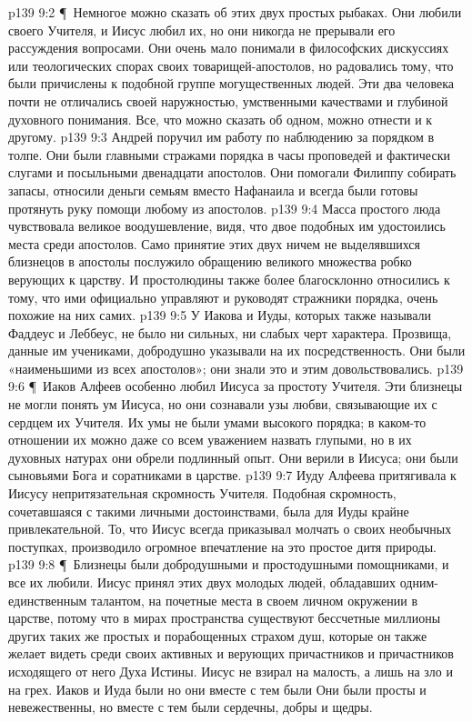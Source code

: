 \vs p139 9:2 \P\ Немногое можно сказать об этих двух простых рыбаках. Они любили своего Учителя, и Иисус любил их, но они никогда не прерывали его рассуждения вопросами. Они очень мало понимали в философских дискуссиях или теологических спорах своих товарищей\hyp{}апостолов, но радовались тому, что были причислены к подобной группе могущественных людей. Эти два человека почти не отличались своей наружностью, умственными качествами и глубиной духовного понимания. Все, что можно сказать об одном, можно отнести и к другому.
\vs p139 9:3 Андрей поручил им работу по наблюдению за порядком в толпе. Они были главными стражами порядка в часы проповедей и фактически слугами и посыльными двенадцати апостолов. Они помогали Филиппу собирать запасы, относили деньги семьям вместо Нафанаила и всегда были готовы протянуть руку помощи любому из апостолов.
\vs p139 9:4 Масса простого люда чувствовала великое воодушевление, видя, что двое подобных им удостоились места среди апостолов. Само принятие этих двух ничем не выделявшихся близнецов в апостолы послужило обращению великого множества робко верующих к царству. И простолюдины также более благосклонно относились к тому, что ими официально управляют и руководят стражники порядка, очень похожие на них самих.
\vs p139 9:5 У Иакова и Иуды, которых также называли Фаддеус и Леббеус, не было ни сильных, ни слабых черт характера. Прозвища, данные им учениками, добродушно указывали на их посредственность. Они были «наименьшими из всех апостолов»; они знали это и этим довольствовались.
\vs p139 9:6 \P\ Иаков Алфеев особенно любил Иисуса за простоту Учителя. Эти близнецы не могли понять ум Иисуса, но они сознавали узы любви, связывающие их с сердцем их Учителя. Их умы не были умами высокого порядка; в каком\hyp{}то отношении их можно даже со всем уважением назвать глупыми, но в их духовных натурах они обрели подлинный опыт. Они верили в Иисуса; они были сыновьями Бога и соратниками в царстве.
\vs p139 9:7 Иуду Алфеева притягивала к Иисусу непритязательная скромность Учителя. Подобная скромность, сочетавшаяся с такими личными достоинствами, была для Иуды крайне привлекательной. То, что Иисус всегда приказывал молчать о своих необычных поступках, производило огромное впечатление на это простое дитя природы.
\vs p139 9:8 \P\ Близнецы были добродушными и простодушными помощниками, и все их любили. Иисус принял этих двух молодых людей, обладавших одним\hyp{}единственным талантом, на почетные места в своем личном окружении в царстве, потому что в мирах пространства существуют бессчетные миллионы других таких же простых и порабощенных страхом душ, которые он также желает видеть среди своих активных и верующих причастников и причастников исходящего от него Духа Истины. Иисус не взирал на малость, а лишь на зло и на грех. Иаков и Иуда были  но они вместе с тем были  Они были просты и невежественны, но вместе с тем были сердечны, добры и щедры.
